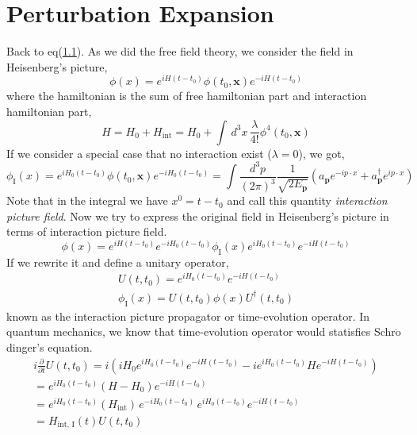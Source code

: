 \documentclass[12pt]{article}
\numberwithin{equation}{section}
\begin{document}
\section{Perturbation Expansion}
Back to eq(\hyperref[1.1]{1.1}).
As we did the free field theory, we consider the field in Heisenberg's picture,
\begin{equation}
    \phi(x) = e^{iH(t-t_0)}\phi(t_0,\mathbf{x})e^{-iH(t-t_0)}
\end{equation}
where the hamiltonian is the sum of free hamiltonian part and interaction hamiltonian part,
\begin{equation}
    H = H_0 + H_{\text{int}} = H_0 + \int\,d^3x\,\frac{\lambda}{4!}\phi^{4}(t_0,\mathbf{x})
\end{equation}
If we consider a special case that no interaction exist ($\lambda = 0$), we got,
\begin{equation}
    \phi_{\text{I}}(x) = e^{iH_0(t-t_0)}\phi(t_0, \mathbf{x})e^{-iH_0(t-t_0)} = \int{\frac{d^3p}{(2\pi)^3}\frac{1}{\sqrt{2E_{\mathbf{p}}}}\left(a_{\mathbf{p}}e^{-ip\cdot x} + a^{\dagger}_{\mathbf{p}}e^{ip\cdot x}\right)}
\end{equation}\label{2.3}
Note that in the integral we have $x^0 = t - t_0$ and call this quantity \textit{interaction picture field}.
Now we try to express the original field in Heisenberg's picture in terms of interaction picture field.
\begin{equation}
    \phi(x) = e^{iH(t-t_0)}e^{-iH_0(t-t_0)}\phi_{\text{I}}(x)e^{iH_0(t-t_0)}e^{-iH(t-t_0)}
\end{equation}
If we rewrite it and define a unitary operator,
\begin{equation}
    \begin{split}
        U(t, t_0) = e^{iH_0(t-t_0)}e^{-iH(t-t_0)}\\
        \phi_{\text{I}}(x) = U(t,t_0)\phi(x)U^{\dagger}(t,t_0)
    \end{split}
\end{equation}
known as the interaction picture propagator or time-evolution operator. 
In quantum mechanics, we know that time-evolution operator would statisfies Schr$\ddot{\text{o}}$dinger's equation.
\begin{equation}
    \begin{split}
        i\frac{\partial}{\partial t}U(t, t_0) = i\left(iH_0e^{iH_0(t-t_0)}e^{-iH(t-t_0)}-ie^{iH_0(t-t_0)}He^{-iH(t-t_0)}\right)\\
        =e^{iH_0(t-t_0)}(H-H_0)e^{-iH(t-t_0)}\\
        =e^{iH_0(t-t_0)}(H_{\text{int}})\,e^{-iH_0(t-t_0)}\,e^{iH_0(t-t_0)}e^{-iH(t-t_0)}\\
        =H_{\text{int, I}}(t)U(t, t_0)
    \end{split}
\end{equation}\label{2.6}
\end{document}
